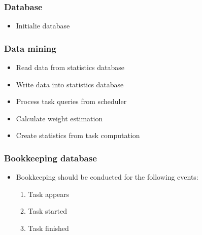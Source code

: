 {	\subsubsection{Database}
	
		\begin{itemize}
			\item Initialie database
		\end{itemize}
		
		\subsubsection{Data mining}
	
			\begin{itemize}
				\item Read data from statistics database %
				\item Write data into statistics database%
				\item Process task queries from scheduler
				\item Calculate weight estimation 
				\item Create statistics from task computation
			\end{itemize}
	
	
		
		
		\subsubsection{Bookkeeping database}
	
			\begin{itemize}
				\item Bookkeeping should be conducted for the following events:
				\begin{enumerate}
					\item Task appears
					\item Task started
					\item Task finished 
				\end{enumerate}
			\end{itemize}
	
}
